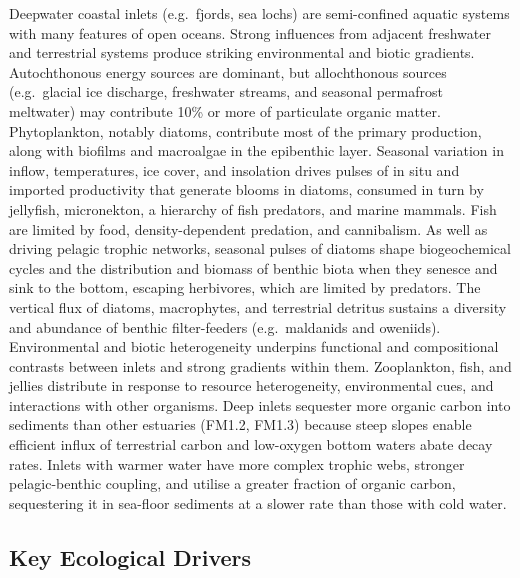 \documentclass[
  letterpaper,
  DIV=11,
  numbers=noendperiod]{scrartcl}
\begin{document}
Deepwater coastal inlets (e.g.~fjords, sea lochs) are semi-confined
aquatic systems with many features of open oceans. Strong influences
from adjacent freshwater and terrestrial systems produce striking
environmental and biotic gradients. Autochthonous energy sources are
dominant, but allochthonous sources (e.g.~glacial ice discharge,
freshwater streams, and seasonal permafrost meltwater) may contribute
10\% or more of particulate organic matter. Phytoplankton, notably
diatoms, contribute most of the primary production, along with biofilms
and macroalgae in the epibenthic layer. Seasonal variation in inflow,
temperatures, ice cover, and insolation drives pulses of in situ and
imported productivity that generate blooms in diatoms, consumed in turn
by jellyfish, micronekton, a hierarchy of fish predators, and marine
mammals. Fish are limited by food, density-dependent predation, and
cannibalism. As well as driving pelagic trophic networks, seasonal
pulses of diatoms shape biogeochemical cycles and the distribution and
biomass of benthic biota when they senesce and sink to the bottom,
escaping herbivores, which are limited by predators. The vertical flux
of diatoms, macrophytes, and terrestrial detritus sustains a diversity
and abundance of benthic filter-feeders (e.g.~maldanids and oweniids).
Environmental and biotic heterogeneity underpins functional and
compositional contrasts between inlets and strong gradients within them.
Zooplankton, fish, and jellies distribute in response to resource
heterogeneity, environmental cues, and interactions with other
organisms. Deep inlets sequester more organic carbon into sediments than
other estuaries (FM1.2, FM1.3) because steep slopes enable efficient
influx of terrestrial carbon and low-oxygen bottom waters abate decay
rates. Inlets with warmer water have more complex trophic webs, stronger
pelagic-benthic coupling, and utilise a greater fraction of organic
carbon, sequestering it in sea-floor sediments at a slower rate than
those with cold water.

\subsection{Key Ecological Drivers}\label{key-ecological-drivers-22}
\end{document}
